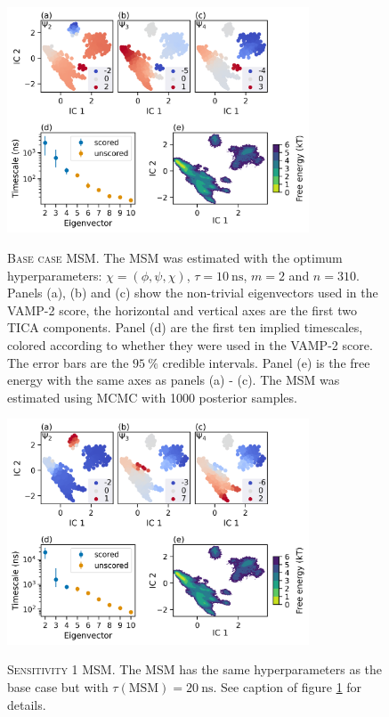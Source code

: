\begin{figure}
    \centering
    \caption[Base case MSM]{\textsc{Base case MSM}. The MSM was estimated with the optimum hyperparameters: $\chi= (\phi, \psi, \chi)$, $\tau=\SI{10}{\nano\second}$, $m=2$ and $n=310$. Panels (a), (b) and (c) show the non-trivial eigenvectors used in the VAMP-2 score, the horizontal and vertical axes are the first two TICA components. Panel (d) are the first ten implied timescales, colored according to whether they were used in the VAMP-2 score. The error bars are the $\SI{95}{\percent}$ credible intervals.  Panel (e) is the free energy with the same axes as panels (a) - (c). The MSM was estimated using MCMC with \num{1000} posterior samples.}
    \includegraphics[width=0.8\textwidth]{chapters/msm_optimization/figures/aadh_msm_best.png}
    \label{fig:aadh_msm_best}
\end{figure}

\begin{figure}
    \centering
    \caption[Sensitivity 1 MSM]{\textsc{Sensitivity 1 MSM}. The MSM has the same hyperparameters as the base case but with $\tau(\mathrm{MSM})=\SI{20}{\nano\second}$. See caption of figure \ref{fig:aadh_msm_best} for details.}
    \includegraphics[width=0.8\textwidth]{chapters/msm_optimization/figures/aadh_msm_sens_1.png}
    \label{fig:aadh_msm_sens_1}
\end{figure}

